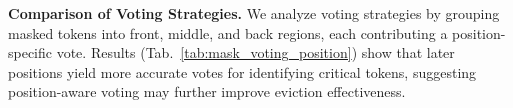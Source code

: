 \noindent \textbf{ Comparison of Voting Strategies.}
We analyze voting strategies by grouping masked tokens into front, middle, and back regions, each contributing a position-specific vote. Results (Tab.~\ref{tab:mask_voting_position}) show that later positions yield more accurate votes for identifying critical tokens, suggesting position-aware voting may further improve eviction effectiveness.


